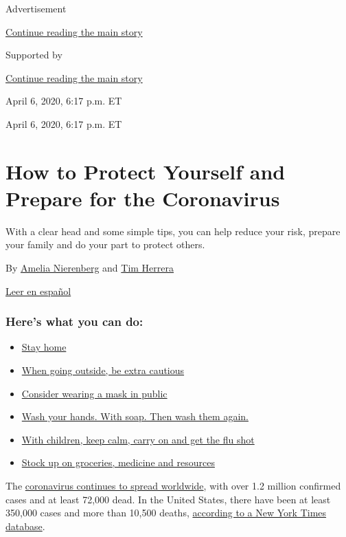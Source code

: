 Advertisement

\protect\hyperlink{after-top}{Continue reading the main story}

Supported by

\protect\hyperlink{after-sponsor}{Continue reading the main story}

April 6, 2020, 6:17 p.m. ET

April 6, 2020, 6:17 p.m. ET

\hypertarget{how-to-protect-yourself-and-prepare-for-the-coronavirus}{%
\section{How to Protect Yourself and Prepare for the
Coronavirus}\label{how-to-protect-yourself-and-prepare-for-the-coronavirus}}

With a clear head and some simple tips, you can help reduce your risk,
prepare your family and do your part to protect others.

By \href{https://www.nytimes.com/by/amelia-nierenberg}{Amelia
Nierenberg} and \href{https://www.nytimes.com/by/tim-herrera}{Tim
Herrera}

\href{https://www.nytimes.com/es/article/el-coronavirus-proteger-preparar.html}{Leer
en español}

\hypertarget{heres-what-you-can-do}{%
\subsubsection{Here's what you can do:}\label{heres-what-you-can-do}}

\begin{itemize}
\tightlist
\item
  \protect\hyperlink{link-5b4d0175}{Stay home}
\item
  \protect\hyperlink{link-7e8a3c72}{When going outside, be extra
  cautious}
\item
  \protect\hyperlink{link-2963e7f4}{Consider wearing a mask in public}
\item
  \protect\hyperlink{link-364448a4}{Wash your hands. With soap. Then
  wash them again.}
\item
  \protect\hyperlink{link-4b7fc30f}{With children, keep calm, carry on
  and get the flu shot}
\item
  \protect\hyperlink{link-385f8aea}{Stock up on groceries, medicine and
  resources}
\end{itemize}

The \href{https://www.nytimes.com/news-event/coronavirus}{coronavirus
continues to spread worldwide}, with over 1.2 million confirmed cases
and at least 72,000 dead. In the United States, there have been at least
350,000 cases and more than 10,500 deaths,
\href{https://www.nytimes.com/interactive/2020/world/coronavirus-maps.html?action=click\&module=RelatedLinks\&pgtype=Article}{according
to a New York Times database}.

